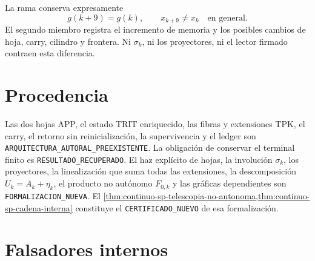 La rama conserva expresamente
\begin{equation}
\label{eq:continuo-sp-no-reset}
 g(k+9)=g(k),
 \qquad
 x_{k+9}\neq x_k\quad\text{en general}.
\end{equation}
El segundo miembro registra el incremento de memoria y los posibles cambios
de hoja, carry, cilindro y frontera. Ni \(\sigma_k\), ni los proyectores, ni
el lector firmado contraen esta diferencia.

\section{Procedencia}

Las dos hojas APP, el estado TRIT enriquecido, las fibras y extensiones TPK,
el carry, el retorno sin reinicialización, la supervivencia y el ledger son
\texttt{ARQUITECTURA\_AUTORAL\_PREEXISTENTE}. La obligación de conservar el
terminal finito es \texttt{RESULTADO\_RECUPERADO}. El haz explícito de hojas,
la involución \(\sigma_k\), los proyectores, la linealización que suma todas
las extensiones, la descomposición \(U_k=A_k+\eta_k\), el producto no
autónomo \(F_{0,k}\) y las gráficas dependientes son
\texttt{FORMALIZACION\_NUEVA}. El
\cref{thm:continuo-sp-telescopia-no-autonoma,thm:continuo-sp-cadena-interna}
constituye el \texttt{CERTIFICADO\_NUEVO} de esa formalización.

\section{Falsadores internos}

